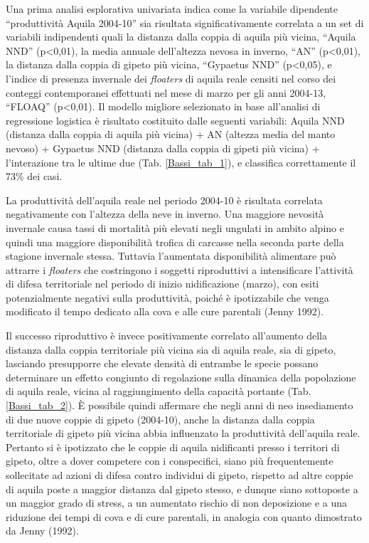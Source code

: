Una prima analisi esplorativa univariata indica come la variabile
dipendente {\textquotedblleft}produttivit\`a Aquila
2004-10{\textquotedblright} sia risultata significativamente correlata
a un set di variabili indipendenti quali la distanza dalla coppia di
aquila pi\`u vicina, {\textquotedblleft}Aquila NND{\textquotedblright}
(p{\textless}0,01), la media annuale dell{\textquoteright}altezza
nevosa in inverno, {\textquotedblleft}AN{\textquotedblright}
(p{\textless}0,01), la distanza dalla coppia di gipeto pi\`u vicina,
{\textquotedblleft}Gypaetus NND{\textquotedblright} (p{\textless}0,05),
e l{\textquoteright}indice di presenza invernale dei \textit{floaters}
di aquila reale censiti nel corso dei conteggi contemporanei effettuati
nel mese di marzo per gli anni 2004-13,
{\textquotedblleft}FLOAQ{\textquotedblright} (p{\textless}0,01). Il
modello migliore selezionato in base all{\textquoteright}analisi di
regressione logistica \`e risultato costituito dalle seguenti
variabili: Aquila NND (distanza dalla coppia di aquila pi\`u vicina) +
AN (altezza media del manto nevoso) + Gypaetus NND (distanza dalla
coppia di gipeti pi\`u vicina) + l{\textquoteright}interazione tra le
ultime due (Tab. \ref{Bassi_tab_1}), e classifica correttamente il 73\% dei casi. 

La produttivit\`a dell{\textquoteright}aquila reale nel periodo 2004-10
\`e risultata correlata negativamente con l{\textquoteright}altezza
della neve in inverno. Una maggiore nevosit\`a invernale causa tassi di
mortalit\`a pi\`u elevati negli ungulati in ambito alpino e quindi una
maggiore disponibilit\`a trofica di carcasse nella seconda parte della
stagione invernale stessa. Tuttavia l{\textquoteright}aumentata
disponibilit\`a alimentare pu\`o attrarre i \textit{floaters} che
costringono i soggetti riproduttivi a intensificare
l{\textquoteright}attivit\`a di difesa territoriale nel periodo di
inizio nidificazione (marzo), con esiti potenzialmente negativi sulla
produttivit\`a, poich\'e \`e ipotizzabile che venga modificato il tempo
dedicato alla cova e alle cure parentali (Jenny 1992). 

Il successo riproduttivo \`e invece positivamente correlato
all{\textquoteright}aumento della distanza dalla coppia territoriale
pi\`u vicina sia di aquila reale, sia di gipeto, lasciando presupporre
che elevate densit\`a di entrambe le specie possano determinare un
effetto congiunto di regolazione sulla dinamica della popolazione di
aquila reale, vicina al raggiungimento della capacit\`a portante (Tab.
\ref{Bassi_tab_2}). \`E possibile quindi affermare che negli anni di neo insediamento
di due nuove coppie di gipeto (2004-10), anche la distanza dalla coppia
territoriale di gipeto pi\`u vicina abbia influenzato la produttivit\`a
dell{\textquoteright}aquila reale. Pertanto si \`e ipotizzato che le
coppie di aquila nidificanti presso i territori di gipeto, oltre a
dover competere con i conspecifici, siano pi\`u frequentemente
sollecitate ad azioni di difesa contro individui di gipeto, rispetto ad
altre coppie di aquila poste a maggior distanza dal gipeto stesso, e
dunque siano sottoposte a un maggior grado di stress, a un aumentato
rischio di non deposizione e a una riduzione dei tempi di cova e di
cure parentali, in analogia con quanto dimostrato da Jenny (1992).

